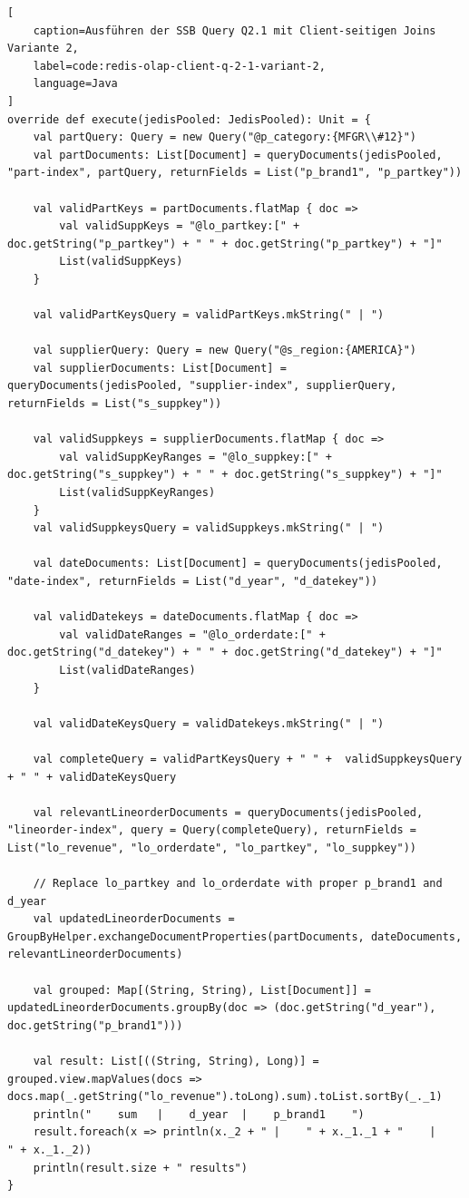 \begin{lstlisting}[
    caption=Ausführen der SSB Query Q2.1 mit Client-seitigen Joins Variante 2,
    label=code:redis-olap-client-q-2-1-variant-2,
    language=Java
]
override def execute(jedisPooled: JedisPooled): Unit = {
	val partQuery: Query = new Query("@p_category:{MFGR\\#12}")
	val partDocuments: List[Document] = queryDocuments(jedisPooled, "part-index", partQuery, returnFields = List("p_brand1", "p_partkey"))

	val validPartKeys = partDocuments.flatMap { doc =>
		val validSuppKeys = "@lo_partkey:[" + doc.getString("p_partkey") + " " + doc.getString("p_partkey") + "]"
		List(validSuppKeys)
	}

	val validPartKeysQuery = validPartKeys.mkString(" | ")
	
	val supplierQuery: Query = new Query("@s_region:{AMERICA}")
	val supplierDocuments: List[Document] = queryDocuments(jedisPooled, "supplier-index", supplierQuery, returnFields = List("s_suppkey"))

	val validSuppkeys = supplierDocuments.flatMap { doc =>
		val validSuppKeyRanges = "@lo_suppkey:[" + doc.getString("s_suppkey") + " " + doc.getString("s_suppkey") + "]"
		List(validSuppKeyRanges)
	}
	val validSuppkeysQuery = validSuppkeys.mkString(" | ")

	val dateDocuments: List[Document] = queryDocuments(jedisPooled, "date-index", returnFields = List("d_year", "d_datekey"))

	val validDatekeys = dateDocuments.flatMap { doc =>
		val validDateRanges = "@lo_orderdate:[" + doc.getString("d_datekey") + " " + doc.getString("d_datekey") + "]"
		List(validDateRanges)
	}

	val validDateKeysQuery = validDatekeys.mkString(" | ")

	val completeQuery = validPartKeysQuery + " " +  validSuppkeysQuery + " " + validDateKeysQuery

	val relevantLineorderDocuments = queryDocuments(jedisPooled, "lineorder-index", query = Query(completeQuery), returnFields = List("lo_revenue", "lo_orderdate", "lo_partkey", "lo_suppkey"))

	// Replace lo_partkey and lo_orderdate with proper p_brand1 and d_year
	val updatedLineorderDocuments = GroupByHelper.exchangeDocumentProperties(partDocuments, dateDocuments, relevantLineorderDocuments)
	
	val grouped: Map[(String, String), List[Document]] = updatedLineorderDocuments.groupBy(doc => (doc.getString("d_year"), doc.getString("p_brand1")))

	val result: List[((String, String), Long)] = grouped.view.mapValues(docs => docs.map(_.getString("lo_revenue").toLong).sum).toList.sortBy(_._1)
	println("    sum   |    d_year  |    p_brand1    ")
	result.foreach(x => println(x._2 + " |    " + x._1._1 + "    |    " + x._1._2))
	println(result.size + " results")
}
\end{lstlisting}




